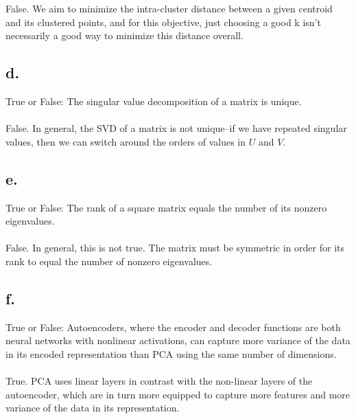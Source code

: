 \documentclass{article}
\newcommand{\1}{\mathbf{1}}
\begin{document}
{False. We aim to minimize the intra-cluster distance between a given centroid and its clustered points, and for this objective, just choosing a good k isn't necessarily a good  way to minimize this distance overall.


\subsection*{d.}

True or False: The singular value decomposition of a matrix is unique. \\ \\

False. In general, the SVD of a matrix is not unique--if we have repeated singular values, then we can switch around the orders of values in $U$ and $V$.

\subsection*{e.}

True or False: The rank of a square matrix equals the number of its nonzero eigenvalues. \\ \\

False. In general, this is not true. The matrix must be symmetric in order for its rank to equal the number of nonzero eigenvalues.

\subsection*{f.}

True or False: Autoencoders, where the encoder and decoder functions are both neural networks with nonlinear activations, can capture more variance of the data in its encoded representation than PCA using the same number of dimensions. \\ \\

True. PCA uses linear layers in contrast with the non-linear layers of the autoencoder, which are in turn more equipped to capture more features and more variance of the data in its representation.

}
\end{document}

